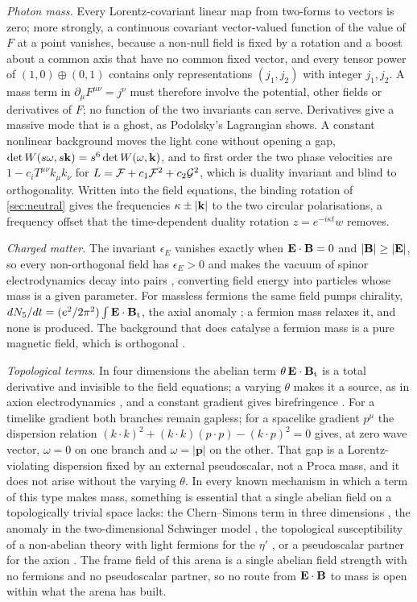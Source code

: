 \emph{Photon mass.} Every Lorentz-covariant linear map from two-forms to vectors is zero; more strongly, a continuous covariant
vector-valued function of the value of $F$ at a point vanishes, because a non-null field is fixed by a rotation and a boost about a common
axis that have no common fixed vector, and every tensor power of $(1,0)\oplus(0,1)$ contains only representations $(j_1,j_2)$ with integer
$j_1,j_2$. A mass term in $\partial_\mu F^{\mu\nu}=j^\nu$ must therefore involve the potential, other fields or derivatives of $F$; no
function of the two invariants can serve. Derivatives give a massive mode that is a ghost, as Podolsky's Lagrangian shows. A constant
nonlinear background moves the light cone without opening a gap, $\det W(s\omega,s\mathbf k)=s^6\det W(\omega,\mathbf k)$, and to first order the two
phase velocities are $1-c_iT^{\mu\nu}k_\mu k_\nu$ for $L=\mathcal F+c_1\mathcal F^2+c_2\mathcal G^2$, which is duality invariant and blind to orthogonality.
Written into the field equations, the binding rotation of \cref{sec:neutral} gives the frequencies $\kappa\pm|\mathbf k|$ to the two circular
polarisations, a frequency offset that the time-dependent duality rotation $z=e^{-i\kappa t}w$ removes.

\emph{Charged matter.} The invariant $\epsilon_E$ vanishes exactly when $\mathbf E\cdot\mathbf B=0$ and $|\mathbf B|\ge|\mathbf E|$, so every non-orthogonal field
has $\epsilon_E>0$ and makes the vacuum of spinor electrodynamics decay into pairs \cite{Schwinger51}, converting field energy into
particles whose mass is a given parameter. For massless fermions the same field pumps chirality, $dN_5/dt=(e^2/2\pi^2)\int\mathbf E\cdot\mathbf B_{\rm t}$,
the axial anomaly \cite{Adler69,BellJackiw69,NielsenNinomiya83}; a fermion mass relaxes it, and none is produced. The background that does
catalyse a fermion mass is a pure magnetic field, which is orthogonal \cite{GusyninMiranskyShovkovy95}.

\emph{Topological terms.} In four dimensions the abelian term $\theta\,\mathbf E\cdot\mathbf B_{\rm t}$ is a total derivative and invisible to the field
equations; a varying $\theta$ makes it a source, as in axion electrodynamics \cite{Wilczek87}, and a constant gradient gives
birefringence \cite{CarrollFieldJackiw90}. For a timelike gradient both branches remain gapless; for a spacelike gradient $p^\mu$ the dispersion relation
$(k\cdot k)^2+(k\cdot k)(p\cdot p)-(k\cdot p)^2=0$ gives, at zero wave vector, $\omega=0$ on one branch and $\omega=|\mathbf p|$ on the other. That gap is a
Lorentz-violating dispersion fixed by an external pseudoscalar, not a Proca mass, and it does not arise without the varying $\theta$. In every known
mechanism in which a term of this type makes mass, something is
essential that a single abelian field on a topologically trivial space lacks: the Chern--Simons term in three dimensions \cite{DJT82}, the
anomaly in the two-dimensional Schwinger model \cite{Schwinger62}, the topological susceptibility of a non-abelian theory with light
fermions for the $\eta'$ \cite{Witten79eta,Veneziano79}, or a pseudoscalar partner for the axion \cite{Weinberg78,Wilczek78}. The frame field
of this arena is a single abelian field strength with no fermions and no pseudoscalar partner, so no route from $\mathbf E\cdot\mathbf B$ to mass is
open within what the arena has built.

